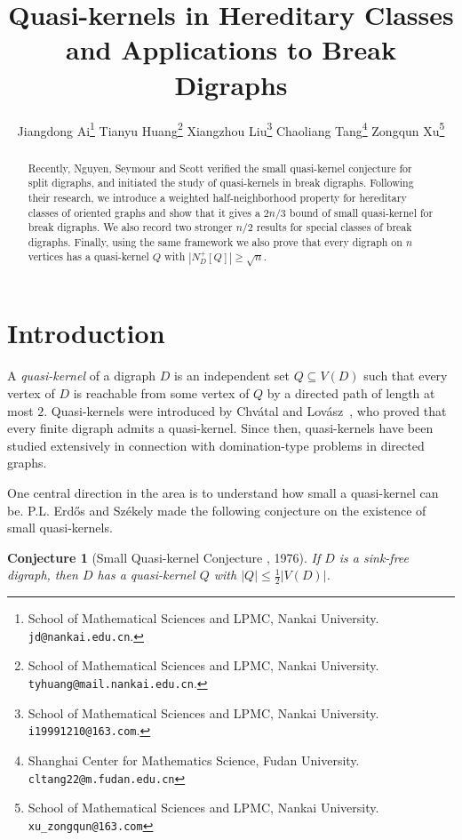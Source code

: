 \documentclass[11pt,a4paper]{article}
\title{Quasi-kernels in Hereditary Classes and Applications to Break Digraphs}
\author{Jiangdong Ai\thanks{School of Mathematical Sciences and LPMC, Nankai University. {\tt jd@nankai.edu.cn}.}
\hspace{2mm}
Tianyu Huang\thanks{School of Mathematical Sciences and LPMC, Nankai University. {\tt tyhuang@mail.nankai.edu.cn}.}
\hspace{2mm}
Xiangzhou Liu\thanks{School of Mathematical Sciences and LPMC, Nankai University. {\tt  
i19991210@163.com}.}
\hspace{2mm} Chaoliang Tang\thanks{Shanghai Center for Mathematics Science, Fudan University. {\tt cltang22@m.fudan.edu.cn}}
\hspace{2mm} 
Zongqun Xu\thanks{School of Mathematical Sciences and LPMC, Nankai University. {\tt xu\_zongqun@163.com}}
}
\newtheorem{conjecture}[theorem]{Conjecture}
\begin{document}
\maketitle

\begin{abstract}
Recently,  Nguyen, Seymour and Scott verified the small quasi-kernel conjecture for split digraphs, and initiated the study of quasi-kernels in break digraphs. Following their research, we introduce a weighted half-neighborhood property for hereditary classes of oriented graphs and show that it gives a \(2n/3\) bound of small quasi-kernel for break digraphs.  We also
record two stronger \(n/2\) results for special classes of break digraphs.
Finally, using the same framework we also prove that every digraph on \(n\) vertices has a quasi-kernel \(Q\) with \(|N_D^+[Q]|\ge \sqrt n\).
\end{abstract}
\section{Introduction}

A \emph{quasi-kernel} of a digraph \(D\) is an independent set
\(Q\subseteq V(D)\) such that every vertex of \(D\) is reachable from some
vertex of \(Q\) by a directed path of length at most \(2\).
Quasi-kernels were introduced by Chv\'atal and Lov\'asz~\cite{CL}, who proved that
every finite digraph admits a quasi-kernel. Since then, quasi-kernels have been
studied extensively in connection with domination-type problems in directed
graphs.

One central direction in the area is to understand how small a quasi-kernel can be. P.L. Erd\H{o}s and Sz\'{e}kely made the following conjecture on the existence of small quasi-kernels. 

\begin{conjecture}[Small Quasi-kernel Conjecture \cite{ES}, 1976]\label{small}
If $D$ is a sink-free digraph, then $D$ has a quasi-kernel $Q$ with $|Q|\leq \frac{1}{2}|V(D)|$.
\end{conjecture}

\end{document}
